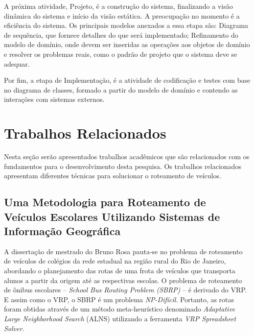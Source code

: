 A próxima atividade, Projeto, é a construção do sistema, finalizando a visão dinâmica do sistema e início da visão estática. A preocupação no momento é a eficiência do sistema. Os principais modelos anexados a essa etapa são: Diagrama de sequência, que fornece detalhes do que será implementado; Refinamento do modelo de domínio, onde devem ser inseridas as operações aos objetos de domínio e resolver os problemas reais, como o padrão de projeto que o sistema deve se adequar.

Por fim, a etapa de Implementação, é a atividade de codificação e testes com base no diagrama de classes, formado a partir do modelo de domínio e contendo as interações com sistemas externos.

\section{Trabalhos Relacionados}
\label{relacionados}
Nesta seção serão apresentados trabalhos acadêmicos que são relacionados com os fundamentos para o desenvolvimento desta pesquisa. Os trabalhos relacionados apresentam diferentes técnicas para solucionar o roteamento de veículos.

\subsection{Uma Metodologia para Roteamento de Veículos Escolares Utilizando Sistemas de Informação Geográfica}

A dissertação de mestrado do Bruno Rosa pauta-se no problema de roteamento de veículos de colégios da rede estadual na região rural do Rio de Janeiro, abordando o planejamento das rotas de uma frota de veículos que transporta alunos a partir da origem até as respectivas escolas. O problema de roteamento de ônibus escolares -- \emph{School Bus Routing Problem (SBRP)} -- é derivado do VRP. E assim como o VRP, o SBRP é um problema \emph{NP-Difícil}. Portanto, as rotas foram obtidas através de um método meta-heurístico denominado \emph{Adaptative Large Neighborhood Search} (ALNS) utilizando a ferramenta \emph{VRP Spreadsheet Solver}.


